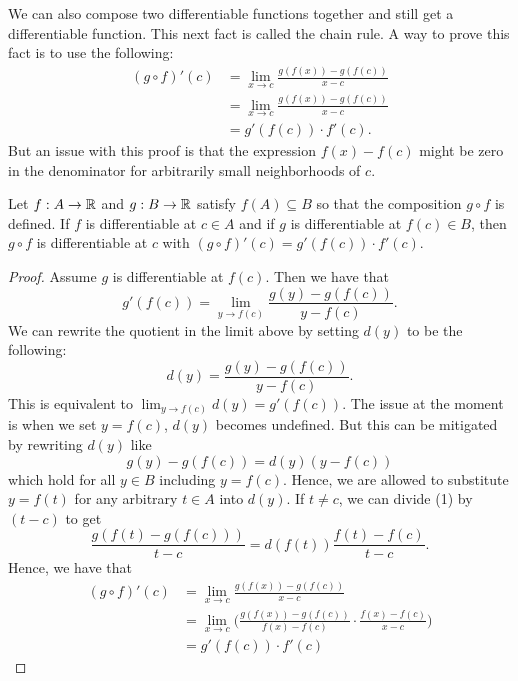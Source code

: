 We can also compose two differentiable functions together and still get a differentiable function. This next fact is called the chain rule. A way to prove this fact is to use the following:
\begin{align*}
   (g \circ f)'(c) &= \lim_{ x \to c  } \frac{ g(f(x)) - g(f(c) ) }{ x - c  }  \\
                   &= \lim_{ x \to c  } \frac{ g(f(x) ) - g(f(c) ) }{ x - c  } \\
                   &= g'(f(c) ) \cdot f'(c).
\end{align*}
But an issue with this proof is that the expression \( f(x) - f(c)  \) might be zero in the denominator for arbitrarily small neighborhoods of \( c  \).

\begin{theorem}
    Let \( f: A \to \mathbb{R}  \) and \( g: B \to \mathbb{R}  \) satisfy \( f(A) \subseteq B  \) so that the composition \(  g  \circ f \) is defined. If \( f  \) is differentiable at \( c \in A  \) and if \( g  \) is differentiable at \( f(c) \in B   \), then \( g \circ f  \) is differentiable at \( c  \) with \( (g \circ f)'(c) = g'(f(c)) \cdot f'(c)\).
    \end{theorem}

\begin{proof}
Assume \( g  \) is differentiable at \( f(c)  \). Then we have that 
\[  g'(f(c) )  = \lim_{ y  \to f(c)  }  \frac{ g(y) - g(f(c)) }{ y - f(c)  }.\]
We can rewrite the quotient in the limit above by setting \( d(y)  \) to be the following:
\[  d(y) = \frac{ g(y) -  g(f(c) ) }{ y - f(c)  }. \]
This is equivalent to \( \lim_{ y \to f(c)  } d(y) = g'(f(c) ) \). The issue at the moment is when we set \( y = f(c)   \), \( d(y)  \) becomes undefined. But this can be mitigated by rewriting \( d(y)  \) like 
\[  g(y) - g(f(c)) = d(y) (y - f(c)) \tag{1} \]
which hold for all \( y \in B  \) including \( y = f(c)  \). Hence, we are allowed to substitute \( y = f(t)  \) for any arbitrary \( t \in A  \) into \( d(y)  \). If \( t \neq c  \), we can divide (1) by \( (t - c ) \) to get 
\[  \frac{ g(f(t) - g(f(c) )) }{ t - c  } = d(f(t)) \frac{ f(t) - f(c)  }{ t - c  }. \]
Hence, we have that 
\begin{align*}
    (g \circ f)'(c) &= \lim_{ x \to c  }  \frac{ g(f(x)) - g(f(c)) }{ x - c   } \\
                    &= \lim_{ x \to c  } \Big( \frac{ g(f(x))  - g(f(c) )}{f(x) - f(c)  } \cdot \frac{ f(x) - f(c) }{ x - c  } \Big) \\
                    &= g'(f(c)) \cdot f'(c)
\end{align*}
\end{proof}

